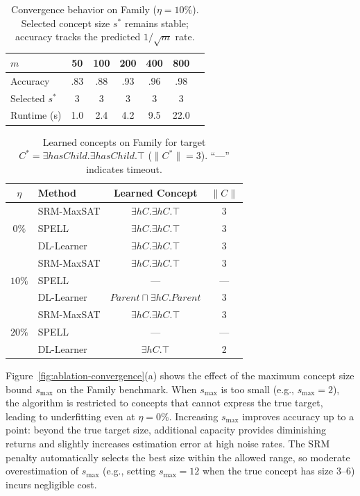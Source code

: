 \documentclass[accepted]{uai2026} %
\theoremstyle{definition}
\theoremstyle{remark}
\begin{document}
\begin{table}[ht]
  \centering
  \caption{Convergence behavior on Family
  ($\eta = 10\%$). Selected concept size $s^*$ remains stable;
  accuracy tracks the predicted $1/\sqrt{m}$
  rate.}\label{tab:convergence}
  \small
  \begin{tabular}{@{}lcccccc@{}}
    \toprule
    $m$ & 50 & 100 & 200 & 400 & 800 \\
    \midrule
    Accuracy & .83 & .88 & .93 & .96 & .98 \\
    Selected $s^*$ & 3 & 3 & 3 & 3 & 3 \\
    Runtime (s) & 1.0 & 2.4 & 4.2 & 9.5 & 22.0 \\
    \bottomrule
  \end{tabular}
\end{table}\begin{table}[ht]
  \centering
  \caption{Learned concepts on Family for
  target $C^* = \exists \mathit{hasChild}.\exists
  \mathit{hasChild}.\top$ ($\|C^*\| = 3$).
  ``---'' indicates
  timeout.}\label{tab:qualitative}
  \small
  \setlength{\tabcolsep}{4pt}
  \begin{tabular}{@{}clcc@{}}
    \toprule
    $\eta$ & \textbf{Method} & \textbf{Learned Concept} & $\|C\|$ \\
    \midrule
    \multirow{3}{*}{$0\%$}
    & SRM-MaxSAT
      & $\exists \mathit{hC}.\exists \mathit{hC}.\top$ & 3 \\
    & SPELL
      & $\exists \mathit{hC}.\exists \mathit{hC}.\top$ & 3 \\
    & DL-Learner
      & $\exists \mathit{hC}.\exists \mathit{hC}.\top$ & 3 \\
    \midrule
    \multirow{3}{*}{$10\%$}
    & SRM-MaxSAT
      & $\exists \mathit{hC}.\exists \mathit{hC}.\top$ & 3 \\
    & SPELL
      & --- & --- \\
    & DL-Learner
      & $\mathit{Parent} \sqcap
        \exists \mathit{hC}.\mathit{Parent}$ & 3 \\
    \midrule
    \multirow{3}{*}{$20\%$}
    & SRM-MaxSAT
      & $\exists \mathit{hC}.\exists \mathit{hC}.\top$ & 3 \\
    & SPELL
      & --- & --- \\
    & DL-Learner
      & $\exists \mathit{hC}.\top$ & 2 \\
    \bottomrule
  \end{tabular}
\end{table}

Figure~\ref{fig:ablation-convergence}(a) shows the
effect of the maximum concept size bound $s_{\max}$ on the Family
benchmark.  When $s_{\max}$ is too small (e.g., $s_{\max} = 2$),
the algorithm is restricted to concepts that cannot express the
true target, leading to underfitting even at $\eta = 0\%$.
Increasing $s_{\max}$ improves accuracy up to a point: beyond the
true target size, additional capacity provides diminishing returns
and slightly increases estimation error at high noise rates.  The
SRM penalty automatically selects the best size within the allowed
range, so moderate overestimation of $s_{\max}$ (e.g., setting
$s_{\max} = 12$ when the true concept has size $3$--$6$) incurs
negligible cost.
\end{document}

